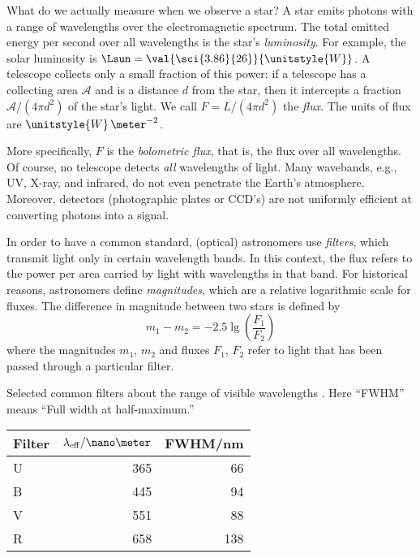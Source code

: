 
What do we actually measure when we observe a star? A star emits photons with a range of wavelengths over the electromagnetic spectrum.  The total emitted energy per second over all wavelengths is the star's \emph{luminosity}.  For example, the solar luminosity is $\Lsun = \val{\sci{3.86}{26}}{\unitstyle{W}}$.  A telescope collects only a small fraction of this power: if a telescope has a collecting area $\mathcal{A}$ and is a distance $d$ from the star, then it intercepts a fraction $\mathcal{A}/(4\pi d^{2})$ of the star's light.  We call $F = L/(4\pi d^{2})$ the \emph{flux}. The units of flux are $\unitstyle{W}\,\meter^{-2}$.

More specifically, $F$ is the \emph{bolometric flux}, that is, the flux over all wavelengths.  Of course, no telescope detects \emph{all} wavelengths of light. Many wavebands, e.g., UV, X-ray, and infrared, do not even penetrate the Earth's atmosphere.  Moreover, detectors (photographic plates or CCD's) are not uniformly efficient at converting photons into a signal.

In order to have a common standard, (optical) astronomers use \emph{filters}, which transmit light only in certain wavelength bands. In this context, the flux refers to the power per area carried by light with wavelengths in that band.  For historical reasons, astronomers define \emph{magnitudes}, which are a relative logarithmic scale for fluxes.  The difference in magnitude between two stars is defined by
\begin{equation}\label{e.magnitude-def}
	m_{1} - m_{2} = -2.5\lg\left(\frac{F_{1}}{F_{2}}\right)
\end{equation}
where the magnitudes $m_{1}$, $m_{2}$ and fluxes $F_{1}$, $F_{2}$ refer to light that has been passed through a particular filter.

\begin{margintable}
\label{t.ubvr}\caption{Selected common filters about the range of visible wavelengths \citep{Binney1998Galactic-Astron}.  Here ``FWHM'' means ``Full width at half-maximum.''}
\begin{tabular}{lrr}
\hline
Filter & $\lambda_{\mathrm{eff}}/\nano\meter$ & FWHM/nm \\
\hline\hline
U & 365 &  66\\
B & 445 &  94\\
V & 551 &  88\\
R & 658 & 138\\
\hline
\end{tabular}
\end{margintable}

